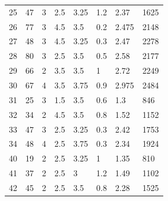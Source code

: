 \begin{table}[h!]
\begin{tabular*}{\linewidth}{p{45pt}<{\centering}p{25pt}<{\centering}
p{35pt}<{\centering}p{45pt}<{\centering}p{35pt}<{\centering}p{66pt}<{\centering}
p{66pt}<{\centering}p{40pt}<{\centering}}
25 & 47 & 3 & 2.5 & 3.25 & 1.2 & 2.37 & 1625 \\
26 & 77 & 3 & 4.5 & 3.5 & 0.2 & 2.475 & 2148 \\
27 & 48 & 3 & 4.5 & 3.25 & 0.3 & 2.47 & 2278 \\
28 & 80 & 3 & 2.5 & 3.5 & 0.5 & 2.58 & 2177 \\
29 & 66 & 2 & 3.5 & 3.5 & 1 & 2.72 & 2249 \\
30 & 67 & 4 & 3.5 & 3.75 & 0.9 & 2.975 & 2484 \\
31 & 25 & 3 & 1.5 & 3.5 & 0.6 & 1.3 & 846 \\
32 & 34 & 2 & 4.5 & 3.5 & 0.8 & 1.52 & 1152 \\
33 & 47 & 3 & 2.5 & 3.25 & 0.3 & 2.42 & 1753 \\
34 & 48 & 4 & 2.5 & 3.75 & 0.3 & 2.34 & 1924 \\ 
40 & 19 & 2 & 2.5 & 3.25 & 1 & 1.35 & 810 \\
41 & 37 & 2 & 2.5 & 3 & 1.2 & 1.49 & 1102 \\
42 & 45 & 2 & 2.5 & 3.5 & 0.8 & 2.28 & 1525 \\
\bottomrule
  \end{tabular*}
  \label{Ap1}
\end{table}

\newpage

